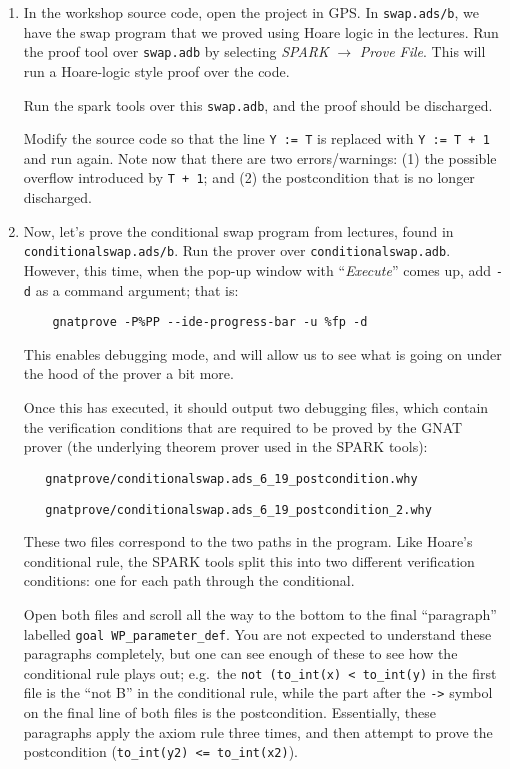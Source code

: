 \documentclass{article}
\begin{document}
\begin{enumerate}


 \item In the workshop source code, open the project in GPS. In {\tt swap.ads/b}, we have the swap program that we proved using Hoare logic in the lectures. Run the proof tool over \texttt{swap.adb} by selecting \emph{SPARK} $\rightarrow$ \emph{Prove File}. This will run a Hoare-logic style proof over the code.

Run the spark tools over this {\tt swap.adb}, and the proof should be discharged.

  Modify the source code so that the line {\tt Y := T} is replaced with {\tt Y := T + 1} and run again. Note now that there are two errors/warnings: (1) the possible overflow introduced by \texttt{T + 1}; and (2) the postcondition that is no longer discharged.

 \item Now, let's prove the conditional swap program from lectures, found in {\tt conditionalswap.ads/b}. Run the prover over \texttt{conditionalswap.adb}. However, this time, when the pop-up window with ``\emph{Execute}'' comes up, add \texttt{-d} as a command argument; that is:

\verb+    gnatprove -P%PP --ide-progress-bar -u %fp -d+

This enables debugging mode, and will allow us to see what is going on under the hood of the prover a bit more.

Once this has executed, it should output two debugging files, which contain the verification conditions that are required to be proved by the GNAT prover (the underlying theorem prover used in the SPARK tools):

\verb+   gnatprove/conditionalswap.ads_6_19_postcondition.why+

\verb+   gnatprove/conditionalswap.ads_6_19_postcondition_2.why+

These two files correspond to the two paths in the program. Like Hoare's conditional rule, the SPARK tools split this into two different verification conditions: one for each path through the conditional. 

Open both files and scroll all the way to the bottom to the final ``paragraph'' labelled \texttt{goal WP\_parameter\_def}. You are not expected to understand these paragraphs completely, but one can see enough of these to see how the conditional rule plays out; e.g.\ the \texttt{not (to\_int(x) <  to\_int(y)} in the first file is the ``not B'' in the conditional rule, while the part after the \texttt{->} symbol on the final line of both files is the postcondition. Essentially, these paragraphs apply the axiom rule three times, and then attempt to prove the postcondition (\texttt{to\_int(y2) <= to\_int(x2)}).


\end{enumerate}
\end{document}
